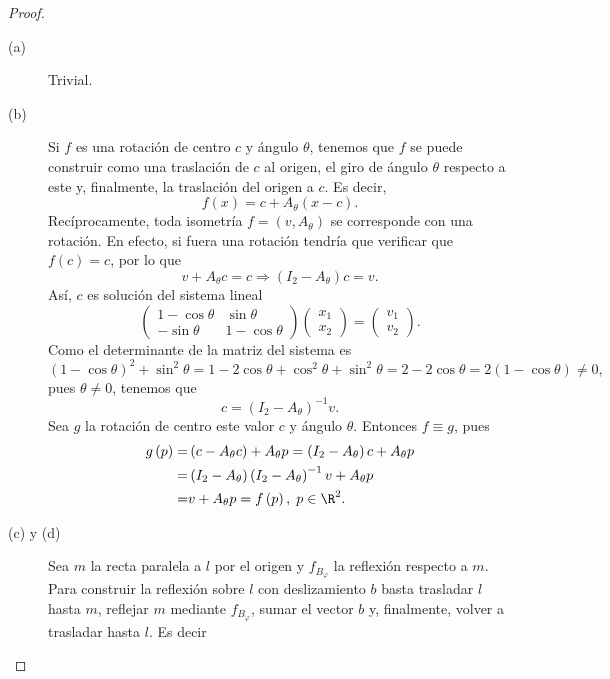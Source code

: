 \begin{proof}
\begin{description}
\item[(a)] Trivial.
\item[(b)] Si $\displaystyle f $ es una rotación de centro $\displaystyle c $  y ángulo $\displaystyle \theta $, tenemos que $\displaystyle f $ se puede construir como una traslación de $\displaystyle c $ al origen, el giro de ángulo $\displaystyle \theta $ respecto a este y, finalmente, la traslación del origen a $\displaystyle c $. Es decir,
	\[f\left(x\right) = c + A_{\theta}\left(x-c\right) .\]
Recíprocamente, toda isometría $\displaystyle f = \left(v, A_{\theta}\right) $ se corresponde con una rotación. En efecto, si fuera una rotación tendría que verificar que $\displaystyle f\left(c\right) = c $, por lo que 
\[v + A_{\theta}c = c \Rightarrow \left(I_{2}-A_{\theta}\right)c=v .\]
Así, $\displaystyle c $ es solución del sistema lineal
\[\begin{pmatrix} 1-\cos\theta & \sin\theta \\ -\sin\theta & 1 - \cos\theta \end{pmatrix}\begin{pmatrix} x_{1} \\ x_{2} \end{pmatrix} = \begin{pmatrix} v_{1} \\ v_{2} \end{pmatrix} .\]
Como el determinante de la matriz del sistema es
\[\left(1-\cos\theta\right)^{2}+ \sin ^{2}\theta = 1 - 2 \cos\theta + \cos^{2}\theta + \sin ^{2}\theta = 2 - 2\cos\theta = 2\left(1-\cos\theta\right) \neq 0,\]
pues $\displaystyle \theta \neq 0 $, tenemos que
\[c = \left(I_{2}-A_{\theta}\right)^{-1}v .\]
Sea $\displaystyle g $ la rotación de centro este valor $\displaystyle c $ y ángulo $\displaystyle \theta $. Entonces $\displaystyle f \equiv g $, pues
\[
\begin{split}
	g\left(p\right) = & \left(c-A_{\theta}c\right) + A_{\theta}p = \left(I_{2}-A_{\theta}\right)c + A_{\theta}p\\
	= & \left(I_{2}-A_{\theta}\right)\left(I_{2}-A_{\theta}\right)^{-1}v + A_{\theta}p \\
	= & v + A_{\theta}p = f\left(p\right), \; p \in \R^{2}.
\end{split}
\]
\item[(c) y (d)] Sea $\displaystyle m $ la recta paralela a $\displaystyle l $ por el origen y $\displaystyle f_{B_{\varphi}} $ la reflexión respecto a $\displaystyle m $. Para construir la reflexión sobre $\displaystyle l $ con deslizamiento $\displaystyle b $ basta trasladar $\displaystyle l $ hasta $\displaystyle m $, reflejar $\displaystyle m $ mediante $\displaystyle f_{B_{\varphi}} $, sumar el vector $\displaystyle b $ y, finalmente, volver a trasladar hasta $\displaystyle l $. Es decir

\end{description}
\end{proof}
